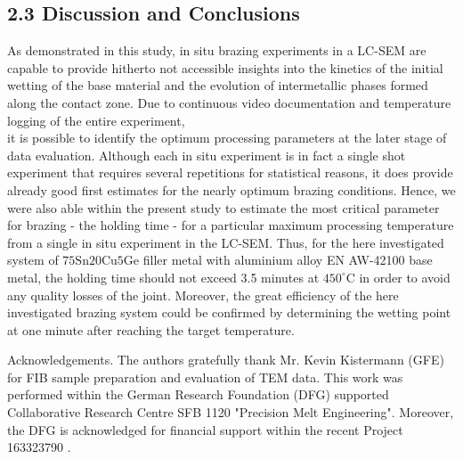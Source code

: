 \documentclass[10pt]{article}
\begin{document}
\subsection*{2.3 Discussion and Conclusions}
As demonstrated in this study, in situ brazing experiments in a LC-SEM are capable to provide hitherto not accessible insights into the kinetics of the initial wetting of the base material and the evolution of intermetallic phases formed along the contact zone. Due to continuous video documentation and temperature logging of the entire experiment,\\
it is possible to identify the optimum processing parameters at the later stage of data evaluation. Although each in situ experiment is in fact a single shot experiment that requires several repetitions for statistical reasons, it does provide already good first estimates for the nearly optimum brazing conditions. Hence, we were also able within the present study to estimate the most critical parameter for brazing - the holding time - for a particular maximum processing temperature from a single in situ experiment in the LC-SEM. Thus, for the here investigated system of $75 \mathrm{Sn} 20 \mathrm{Cu} 5 \mathrm{Ge}$ filler metal with aluminium alloy EN AW-42100 base metal, the holding time should not exceed 3.5 minutes at $450^{\circ} \mathrm{C}$ in order to avoid any quality losses of the joint. Moreover, the great efficiency of the here investigated brazing system could be confirmed by determining the wetting point at one minute after reaching the target temperature.

Acknowledgements. The authors gratefully thank Mr. Kevin Kistermann (GFE) for FIB sample preparation and evaluation of TEM data. This work was performed within the German Research Foundation (DFG) supported Collaborative Research Centre SFB 1120 "Precision Melt Engineering". Moreover, the DFG is acknowledged for financial support within the recent Project 163323790 .
\end{document}
